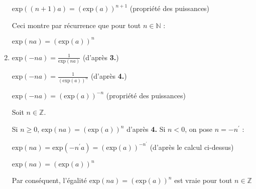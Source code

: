 \begin{corrige}
\begin{enumerate}
     \par
     $\text{exp}\left(\left(n+1\right)a\right)=\left(\text{exp}\left(a\right)\right)^{n+1}$ (propriété des puissances)
     \par
     Ceci montre par récurrence que pour tout $n \in  \mathbb{N}$ :
     \par
     $\text{exp}\left(na\right) = \left(\text{exp}\left(a\right)\right)^{n}$
     \item
     $\text{exp}\left(-na\right) = \frac{1}{\text{exp}\left(na\right)}$  (d'après \textbf{3.})
     \par
     $\text{exp}\left(-na\right) = \frac{1}{\left(\text{exp}\left(a\right)\right)^{n}}$  (d'après \textbf{4.})
     \par
     $\text{exp}\left(-na\right) = \left(\text{exp}\left(a\right)\right)^{-n}$  (propriété des puissances)
     \par
     Soit $n \in  \mathbb{Z}$.
     \par
     Si $n\geqslant 0$, $\text{exp}\left(na\right) = \left(\text{exp}\left(a\right)\right)^{n}$ d'après \textbf{4.}
     Si $n < 0$, on pose $n=-n^{\prime}$ :
     \par
     $\text{exp}\left(na\right) = \text{exp}\left(-n^{\prime}a\right)=\left(\text{exp}\left(a\right)\right)^{-n^{\prime}}$ (d'après le calcul ci-dessus)
     \par
     $\text{exp}\left(na\right) = \left(\text{exp}\left(a\right)\right)^{n}$
     \par
     Par conséquent, l'égalité $\text{exp}\left(na\right) = \left(\text{exp}\left(a\right)\right)^{n}$ est vraie pour tout $n \in  \mathbb{Z}$
\end{enumerate}
     \end{corrige}
